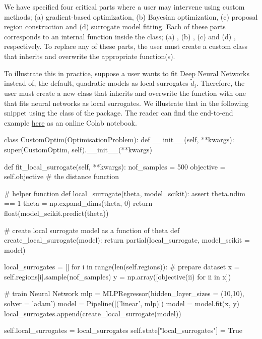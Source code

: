 \documentclass[article, shortnames]{jss}
\begin{document}
We have specified four critical parts where a user may intervene using
custom methods; (a) gradient-based optimization, (b) Bayesian
optimization, (c) proposal region construction and (d) surrogate model
fitting. Each of these parts corresponds to an internal function
inside the  class; (a)
, (b) , (c)
 and (d) ,
respectively. To replace any of these parts, the user must create a
custom class that inherits  and overwrite the
appropriate function(s).

To illustrate this in practice, suppose a user wants to fit Deep
Neural Networks instead of, the default, quadratic models as local
surrogates \(\tilde{d}_i\). Therefore, the user must create a new
class that inherits  and overwrite the
 function with one that fits
neural networks as local surrogates. We illustrate that in the
following snippet using the  class
of the  package. The reader can find the end-to-end
example
\href{https://colab.research.google.com/drive/1_jHVxPSH3XcNOORZJpLU0SPzs0PF8CQ5?usp=sharing}{here}
as an online Colab notebook.


\begin{Code}
class CustomOptim(OptimisationProblem):
    def __init__(self, **kwargs):
        super(CustomOptim, self).__init__(**kwargs)

    def fit_local_surrogate(self, **kwargs):
        nof_samples = 500
        objective = self.objective # the distance function

        # helper function
        def local_surrogate(theta, model_scikit):
            assert theta.ndim == 1
            theta = np.expand_dims(theta, 0)
            return float(model_scikit.predict(theta))

        # create local surrogate model as a function of theta
        def create_local_surrogate(model):
            return partial(local_surrogate, model_scikit = model)

        local_surrogates = []
        for i in range(len(self.regions)):
            # prepare dataset
            x = self.regions[i].sample(nof_samples)
            y = np.array([objective(ii) for ii in x])

            # train Neural Network
            mlp = MLPRegressor(hidden_layer_sizes = (10,10), solver = 'adam')
            model = Pipeline([('linear', mlp)])
            model = model.fit(x, y)
            local_surrogates.append(create_local_surrogate(model))

        self.local_surrogates = local_surrogates
        self.state["local_surrogates"] = True
\end{Code}
\end{document}
